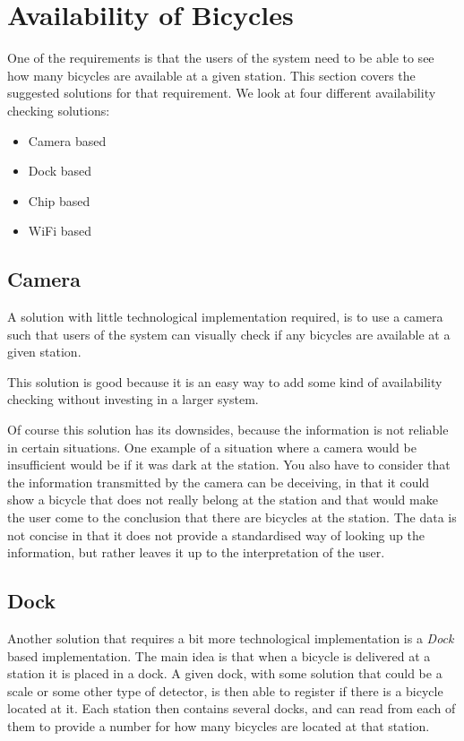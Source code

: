 \section{Availability of Bicycles}\label{sec:availability}
One of the requirements is that the users of the system need to be able to see how many bicycles are available at a given station.
This section covers the suggested solutions for that requirement.
We look at four different availability checking solutions:

\begin{itemize}
\item Camera based
\item Dock based
\item Chip based
\item WiFi based
\end{itemize} 

\subsection{Camera}
A solution with little technological implementation required, is to use a camera such that users of the system can visually check if any bicycles are available at a given station. 

This solution is good because it is an easy way to add some kind of availability checking without investing in a larger system.

Of course this solution has its downsides, because the information is not reliable in certain situations. 
One example of a situation where a camera would be insufficient would be if it was dark at the station.
You also have to consider that the information transmitted by the camera can be deceiving, in that it could show a bicycle that does not really belong at the station and that would make the user come to the conclusion that there are bicycles at the station.
The data is not concise in that it does not provide a standardised way of looking up the information, but rather leaves it up to the interpretation of the user.

\subsection{Dock}
Another solution that requires a bit more technological implementation is a \textit{Dock} based implementation.
The main idea is that when a bicycle is delivered at a station it is placed in a dock.
A given dock, with some solution that could be a scale or some other type of detector, is then able to register if there is a bicycle located at it.
Each station then contains several docks, and can read from each of them to provide a number for how many bicycles are located at that station. 

